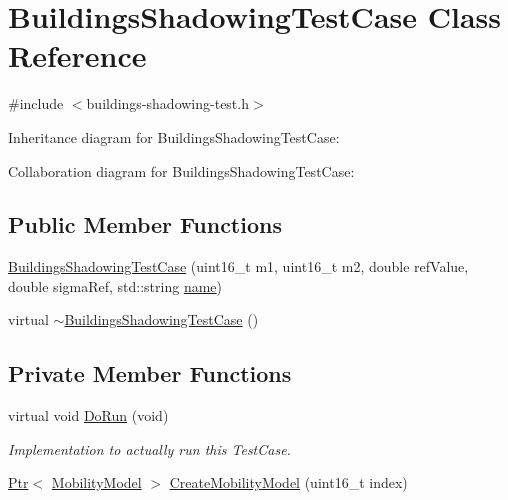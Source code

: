 \hypertarget{classBuildingsShadowingTestCase}{}\section{Buildings\+Shadowing\+Test\+Case Class Reference}
\label{classBuildingsShadowingTestCase}


{\ttfamily \#include $<$buildings-\/shadowing-\/test.\+h$>$}



Inheritance diagram for Buildings\+Shadowing\+Test\+Case\+:


Collaboration diagram for Buildings\+Shadowing\+Test\+Case\+:
\subsection*{Public Member Functions}
\begin{DoxyCompactItemize}
\item 
\hyperlink{classBuildingsShadowingTestCase_ace808e25e20e59868c3e312e5f8a5118}{Buildings\+Shadowing\+Test\+Case} (uint16\+\_\+t m1, uint16\+\_\+t m2, double ref\+Value, double sigma\+Ref, std\+::string \hyperlink{generate__test__data__lte__spectrum__model_8m_ab74e6bf80237ddc4109968cedc58c151}{name})
\item 
virtual \hyperlink{classBuildingsShadowingTestCase_aa07d55539962ee1c24dbc8aac6ce89a6}{$\sim$\+Buildings\+Shadowing\+Test\+Case} ()
\end{DoxyCompactItemize}
\subsection*{Private Member Functions}
\begin{DoxyCompactItemize}
\item 
virtual void \hyperlink{classBuildingsShadowingTestCase_af15f6da1544ebf8348987f0829678932}{Do\+Run} (void)
\begin{DoxyCompactList}\small\item\em Implementation to actually run this Test\+Case. \end{DoxyCompactList}\item 
\hyperlink{classns3_1_1Ptr}{Ptr}$<$ \hyperlink{classns3_1_1MobilityModel}{Mobility\+Model} $>$ \hyperlink{classBuildingsShadowingTestCase_a43039af62f5ba963a7132f8f1cafe5e1}{Create\+Mobility\+Model} (uint16\+\_\+t index)
\end{DoxyCompactItemize}
